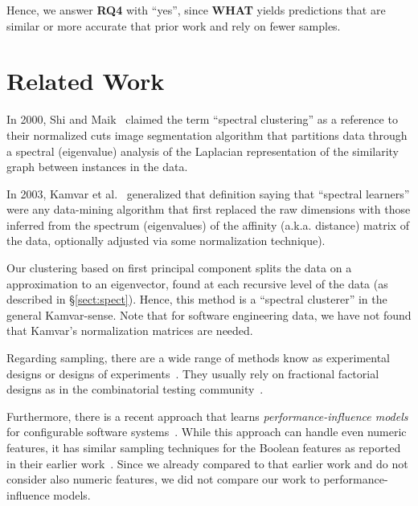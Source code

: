 \documentclass{sig-alternative}
\newcommand{\tion}[1]{\S\ref{sect:#1}}
\newcommand{\what}{{\bf WHAT }}
\begin{document}
\begin{myshadowbox}
Hence, we answer {\bf RQ4} with ``yes'',
since \what yields predictions that are similar or more accurate that prior
work and rely on fewer samples.
\end{myshadowbox}


 \section{Related Work}
\label{sect:related}
 
In 2000, Shi and Maik~\cite{shi00} claimed the term ``spectral clustering'' as a reference to their normalized cuts
image
segmentation algorithm that  partitions data through a spectral (eigenvalue) analysis of the  
Laplacian representation of the similarity graph between instances in the data.

In 2003, Kamvar et al.~\cite{kamvar2003spectral}  generalized that definition saying that ``spectral learners''
were any data-mining algorithm that first replaced the raw
dimensions with those inferred from the spectrum (eigenvalues) of the affinity (a.k.a. distance)
matrix of the data, optionally adjusted via some normalization technique).

Our clustering based on first principal component splits the data on a   approximation to an eigenvector, found at each recursive level
of the data (as described in \tion{spect}). 
Hence, this  method is a ``spectral clusterer'' in the general Kamvar-sense. 
Note that
for software engineering data, we have
not found that Kamvar's normalization matrices are needed.

Regarding sampling, there are a wide range of methods know as experimental designs or designs of experiments~\cite{pukelsheim2006optimal}. They usually rely on fractional factorial designs as in the combinatorial testing community~\cite{Kuhn:2013}. 

Furthermore, there is a recent approach that learns {\em performance-influence models} for configurable software systems~\cite{SGA+15}. While this approach can handle even numeric features, it has similar sampling techniques for the Boolean features as reported in their earlier work~\cite{siegmund2012predicting}. Since we already compared to that earlier work and do not consider also numeric features, we did not compare our work to performance-influence models.
 
\end{document}
